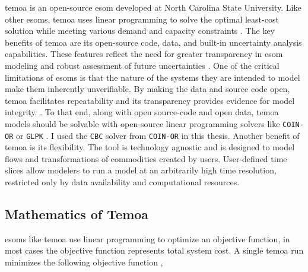 \gls{temoa} is an open-source \gls{esom} developed at North Carolina State University.
Like other \glspl{esom}, \gls{temoa} uses linear programming to solve the optimal
least-cost solution while meeting various demand and capacity constraints \cite{hunter_modeling_2013}.
The key benefits of \gls{temoa} are its open-source code, data, and built-in
uncertainty analysis capabilities. These features reflect the need for greater
transparency in \gls{esom} modeling and robust assessment of future uncertainties
\cite{hunter_modeling_2013}. One of the critical limitations of \glspl{esom} is that
the nature of the systems they are intended to model make them inherently
unverifiable. By making the data and source code open,
\gls{temoa} facilitates repeatability and its transparency provides evidence for
model integrity.
\cite{decarolis_case_2012}. To that end, along with open source-code and open data,
\gls{temoa} models should be solvable
with open-source linear programming solvers like \texttt{COIN-OR} \cite{noauthor_coin-or_nodate} or \texttt{GLPK} \cite{noauthor_glpk_nodate}. I used the
\texttt{CBC} solver from \texttt{COIN-OR} \cite{noauthor_cbc_2021} in this thesis.
Another benefit of \gls{temoa} is its flexibility.
The tool is technology agnostic and is designed to model flows and transformations
of commodities created by users.
User-defined time slices allow modelers to run a model at an arbitrarily high
time resolution, restricted only by data availability and computational resources.

\subsection{Mathematics of Temoa}
\glspl{esom} like \gls{temoa} use linear programming to optimize an objective
function, in most cases the objective function represents total system cost.
A single \gls{temoa} run minimizes the following objective function \cite{noauthor_preface_nodate},


